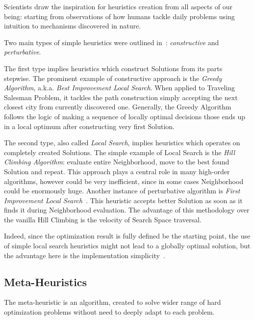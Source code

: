 Scientists draw the inspiration for heuristics creation from all aspects of our being: starting from observations of how humans tackle daily problems using intuition to mechanisms discovered in nature.

Two main types of simple heuristics were outlined in~\cite{burke2019classification}: \textit{constructive} and \textit{perturbative}. 

The first type implies heuristics which construct Solutions from its parts stepwise. 
The prominent example of constructive approach is the \textit{Greedy Algorithm}, a.k.a. \textit{Best Improvement Local Search}. When applied to Traveling Salesman Problem, it tackles the path construction simply accepting the next closest city from currently discovered one. Generally, the Greedy Algorithm follows the logic of making a sequence of locally optimal decisions those ends up in a local optimum after constructing very first Solution. 

The second type, also called \textit{Local Search}, implies heuristics which operates on completely created Solutions. The simple example of Local Search is the \textit{Hill Climbing Algorithm}: evaluate entire Neighborhood, move to the best found Solution and repeat. This approach plays a central role in many high-order algorithms, however could be very inefficient, since in some cases Neighborhood could be enormously huge. 
Another instance of perturbative algorithm is \textit{First Improvement Local Search}~\cite{voudouris1999guided}. This heuristic accepts better Solution as soon as it finds it during Neighborhood evaluation. The advantage of this methodology over the vanilla Hill Climbing is the velocity of Search Space traversal.

Indeed, since the optimization result is fully defined be the starting point, the use of simple local search heuristics might not lead to a globally optimal solution, but the advantage here is the implementation simplicity~\cite{williamson2011design}.

 
\subsection{Meta-Heuristics}
The meta-heuristic is an algorithm, created to solve wider range of hard optimization problems without need to deeply adapt to each problem.

